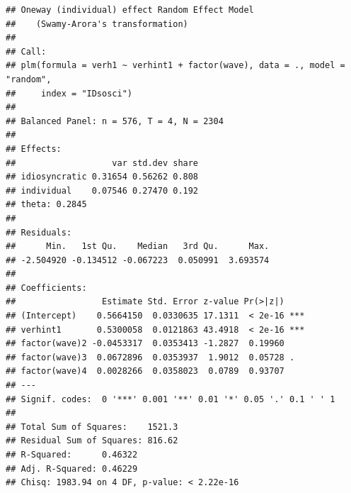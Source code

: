 \documentclass[
]{book}
\newenvironment{Shaded}{\begin{snugshade}}{\end{snugshade}}
\newcommand{\CommentTok}[1]{\textcolor[rgb]{0.56,0.35,0.01}{\textit{#1}}}
\newcommand{\DataTypeTok}[1]{\textcolor[rgb]{0.13,0.29,0.53}{#1}}
\newcommand{\KeywordTok}[1]{\textcolor[rgb]{0.13,0.29,0.53}{\textbf{#1}}}
\newcommand{\NormalTok}[1]{#1}
\newcommand{\OperatorTok}[1]{\textcolor[rgb]{0.81,0.36,0.00}{\textbf{#1}}}
\newcommand{\StringTok}[1]{\textcolor[rgb]{0.31,0.60,0.02}{#1}}
\begin{document}
\begin{verbatim}
## Oneway (individual) effect Random Effect Model 
##    (Swamy-Arora's transformation)
## 
## Call:
## plm(formula = verh1 ~ verhint1 + factor(wave), data = ., model = "random", 
##     index = "IDsosci")
## 
## Balanced Panel: n = 576, T = 4, N = 2304
## 
## Effects:
##                   var std.dev share
## idiosyncratic 0.31654 0.56262 0.808
## individual    0.07546 0.27470 0.192
## theta: 0.2845
## 
## Residuals:
##      Min.   1st Qu.    Median   3rd Qu.      Max. 
## -2.504920 -0.134512 -0.067223  0.050991  3.693574 
## 
## Coefficients:
##                 Estimate Std. Error z-value Pr(>|z|)    
## (Intercept)    0.5664150  0.0330635 17.1311  < 2e-16 ***
## verhint1       0.5300058  0.0121863 43.4918  < 2e-16 ***
## factor(wave)2 -0.0453317  0.0353413 -1.2827  0.19960    
## factor(wave)3  0.0672896  0.0353937  1.9012  0.05728 .  
## factor(wave)4  0.0028266  0.0358023  0.0789  0.93707    
## ---
## Signif. codes:  0 '***' 0.001 '**' 0.01 '*' 0.05 '.' 0.1 ' ' 1
## 
## Total Sum of Squares:    1521.3
## Residual Sum of Squares: 816.62
## R-Squared:      0.46322
## Adj. R-Squared: 0.46229
## Chisq: 1983.94 on 4 DF, p-value: < 2.22e-16
\end{verbatim}

\begin{Shaded}
\end{Shaded}
\end{document}
